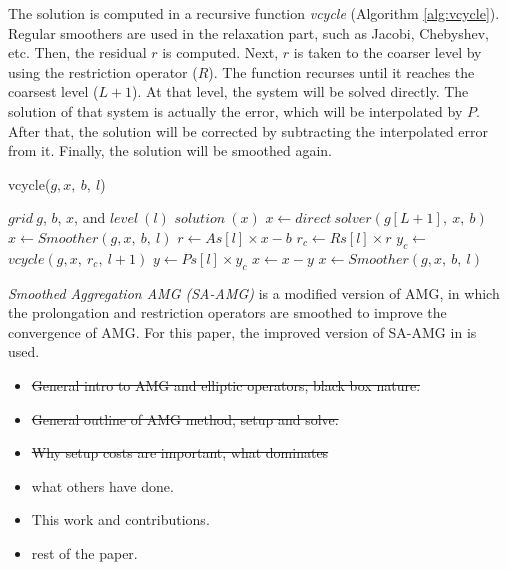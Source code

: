 The solution is computed in a recursive function \textit{vcycle} (Algorithm \ref{alg:vcycle}).
Regular smoothers are used in the relaxation part, such as Jacobi, Chebyshev, etc.
Then, the residual $r$ is computed. Next, $r$ is taken to the coarser level by using
the restriction operator ($R$).
The function recurses until it reaches the coarsest level ($L+1$). At that level,
the system will be solved directly. The solution of that system is actually the error,
which will be interpolated by $P$.
After that, the solution will be corrected by subtracting the interpolated error from it.
Finally, the solution will be smoothed again.

\begin{algorithm}[ht] 
  \caption{vcycle($g, x,\ b,\ l$)} \label{alg:vcycle} 
  \begin{algorithmic}[1]
    \Require $grid\ g$, $b$, $x$, and $level\ (l)$
    \Ensure  $solution\ (x)$
      \State $x \leftarrow direct\ solver(g[L+1],\ x,\ b)$
    \Else
      \State $x \leftarrow Smoother(g, x,\ b,\ l)$
      \State $r \leftarrow As[l] \times x - b$
      \State $r_c \leftarrow Rs[l] \times r$
      \State $y_c \leftarrow$ $vcycle(g, x,\ r_c,\ l+1)$
      \State $y \leftarrow Ps[l] \times y_c$
      \State $x \leftarrow x - y$
      \State $x \leftarrow Smoother(g, x,\ b,\ l)$
    \EndIf
  \end{algorithmic}
\end{algorithm}

\textit{Smoothed Aggregation AMG (SA-AMG)}\cite{Vanek:1995} is a modified version of AMG,
in which the prolongation and restriction operators are smoothed %
to improve the convergence of AMG.
For this paper, the improved version of SA-AMG in \cite{treister2015non} is used.

\begin{itemize}
  \item \st{General intro to AMG and elliptic operators, black box nature.}
  \item \st{General outline of AMG method, setup and solve.}
  \item \st{Why setup costs are important, what dominates}
  \item what others have done.
  \item This work and contributions.
  \item rest of the paper.
\end{itemize}
